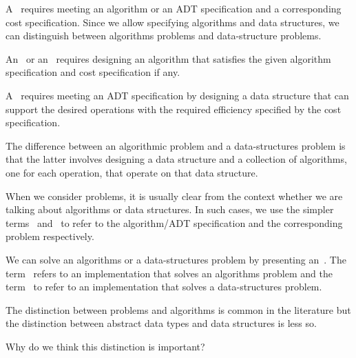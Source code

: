 \begin{gram}[Problem]
%
A~ requires meeting an algorithm or an ADT specification
and a corresponding cost specification.
%
Since we allow specifying algorithms and data structures, we can
distinguish between algorithms problems and data-structure problems.
%

An~ or an~
requires designing an algorithm that satisfies the given algorithm
specification and cost specification if any.
%

A~ requires meeting an ADT
specification by designing a data structure that can
support the desired operations with the required efficiency specified
by the cost specification.
%

The difference between an algorithmic problem and a data-structures
problem is that the latter involves designing a data structure and a
collection of algorithms, one for each operation, that operate on that
data structure.
\end{gram}

\begin{note}
When we consider problems, it is usually clear from the context
whether we are talking about algorithms or data structures.
%
In such cases, we use the simpler terms~
and~ to refer to the algorithm/ADT specification and the
corresponding problem respectively.
\end{note}

\begin{gram}[Implementation]
We can solve an algorithms or a data-structures problem by presenting
an~.  
%
The term~ refers to an implementation that solves an
algorithms problem and the term~ to
refer to an implementation that solves a data-structures problem.
\end{gram}


\begin{note}
The distinction between problems and algorithms is common in the
literature but the distinction between abstract data types and data
structures is less so.
\end{note}


\begin{teachnote}
Why do we think this distinction is important?
\end{teachnote}

